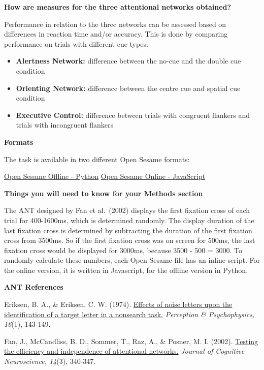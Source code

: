 \documentclass[
]{book}
\providecommand{\tightlist}{%
  \setlength{\itemsep}{0pt}\setlength{\parskip}{0pt}}
\begin{document}
\textbf{How are measures for the three attentional networks obtained?}

Performance in relation to the three networks can be assessed based on differences in reaction time and/or accuracy. This is done by comparing performance on trials with different cue types:

\begin{itemize}
\tightlist
\item
  \textbf{Alertness Network:} difference between the no-cue and the double cue condition
\item
  \textbf{Orienting Network:} difference between the centre cue and spatial cue condition
\item
  \textbf{Executive Control:} difference between trials with congruent flankers and trials with incongruent flankers
\end{itemize}

\textbf{Formats}

The task is available in two different Open Sesame formats:

\href{https://github.com/jmattschey/MScConversionExperiments/blob/master/GitHub/ANT_OfflineWithPython.zip}{Open Sesame Offline - Python} \textbar{} \href{https://github.com/jmattschey/MScConversionExperiments/blob/master/GitHub/ANT_OnlineWithJS.zip}{Open Sesame Online - JavaScript}

\textbf{Things you will need to know for your Methods section}

The ANT designed by Fan et al.~(2002) displays the first fixation cross of each trial for 400-1600ms, which is determined randomly. The display duration of the last fixation cross is determined by subtracting the duration of the first fixation cross from 3500ms. So if the first fixation cross was on screen for 500ms, the last fixation cross would be displayed for 3000ms, because 3500 - 500 = 3000. To randomly calculate these numbers, each Open Sesame file has an inline script. For the online version, it is written in Javascript, for the offline version in Python.

\textbf{ANT References}

Eriksen, B. A., \& Eriksen, C. W. (1974). \href{https://link.springer.com/content/pdf/10.3758/BF03203267.pdf}{Effects of noise letters upon the identification of a target letter in a nonsearch task.} \emph{Perception \& Psychophysics, 16}(1), 143-149.

Fan, J., McCandliss, B. D., Sommer, T., Raz, A., \& Posner, M. I. (2002). \href{http://citeseerx.ist.psu.edu/viewdoc/download?doi=10.1.1.474.442\&rep=rep1\&type=pdf}{Testing the efficiency and independence of attentional networks.} \emph{Journal of Cognitive Neuroscience, 14}(3), 340-347.
\end{document}
